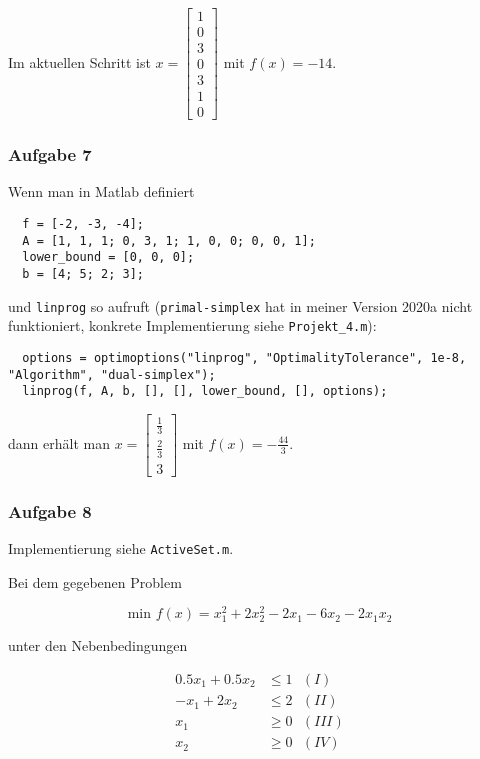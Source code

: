 \documentclass[a4paper, 12pt]{report}
\begin{document}
Im aktuellen Schritt ist $x = \begin{bmatrix} 1\\0\\3\\0\\3\\1\\0 \end{bmatrix}$ mit $f(x) = -14$.

\subsubsection{Aufgabe 7}
Wenn man in Matlab definiert

\begin{lstlisting}
  f = [-2, -3, -4];
  A = [1, 1, 1; 0, 3, 1; 1, 0, 0; 0, 0, 1];
  lower_bound = [0, 0, 0];
  b = [4; 5; 2; 3];\end{lstlisting}

und \lstinline[basicstyle=\ttfamily\color{black}]|linprog| so aufruft
(\lstinline[basicstyle=\ttfamily\color{black}]|primal-simplex| hat in meiner Version 2020a nicht funktioniert,
konkrete Implementierung siehe \lstinline[basicstyle=\ttfamily\color{black}]|Projekt_4.m|):

\begin{lstlisting}
  options = optimoptions("linprog", "OptimalityTolerance", 1e-8, "Algorithm", "dual-simplex");
  linprog(f, A, b, [], [], lower_bound, [], options);\end{lstlisting}

dann erhält man $x = \begin{bmatrix}\frac{1}{3}\\[6pt]\frac{2}{3}\\[6pt]3\end{bmatrix}$ mit $f(x) = -\frac{44}{3}$.

\subsubsection{Aufgabe 8}
Implementierung siehe \lstinline[basicstyle=\ttfamily\color{black}]|ActiveSet.m|.\par
Bei dem gegebenen Problem

$$ \text{min } f(x) = x_1^2 + 2x_2^2 - 2x_1 - 6x_2 - 2x_1x_2 $$

unter den Nebenbedingungen

\begin{align*} 
  0.5x_1 + 0.5x_2 &\leq 1 \text{  } (I)\\
  -x_1 + 2x_2 &\leq 2 \text{  } (II)\\
  x_1 &\geq 0 \text{  } (III)\\
  x_2 &\geq 0 \text{  } (IV)
\end{align*}
\end{document}
